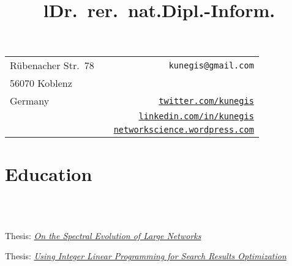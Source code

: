 \documentclass[line,margin]{res}
\begin{document}
\begin{resume}

\vspace{0.5cm}

\hspace{-3cm}
\begin{tabular}{lcr}
  Rübenacher Str.\ 78                       & \hspace{7.0cm}\hfill &  {\tt kunegis@gmail.com}\\
  56070 Koblenz                              && 
  \\
  Germany                                    &&
  {\tt \href{http://twitter.com/kunegis}{twitter.com/kunegis}} \\
  && {\tt \href{http://www.linkedin.com/in/kunegis}{linkedin.com/in/kunegis}} \\
  && {\tt \href{http://networkscience.wordpress.com/}{networkscience.wordpress.com}} 
\end{tabular}
\vspace{1cm}


\section{Education}

\begin{format}
\title{l}\\
\\
\end{format}

\title{\bf Dr.\ rer.\ nat.}
\begin{position}
Thesis:
\emph{\href{http://userpages.uni-koblenz.de/~kunegis/paper/kunegis-phd-thesis-on-the-spectral-evolution-of-large-networks.pdf}{On
    the Spectral Evolution of Large Networks}}  
\end{position}

\title{\bf Dipl.-Inform.}
\begin{position}
Thesis: \emph{\href{http://userpages.uni-koblenz.de/~kunegis/paper/kunegis-diploma-thesis-using-integer-linear-programming-for-search-results-optimization.pdf}{Using Integer Linear Programming for Search Results Optimization}}
\end{position}


\end{resume}
\end{document}
